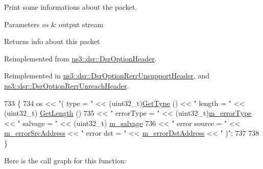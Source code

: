 Print some informations about the packet. 


\begin{DoxyParams}{Parameters}
{\em os} & output stream \\
\hline
\end{DoxyParams}
\begin{DoxyReturn}{Returns}
info about this packet 
\end{DoxyReturn}


Reimplemented from \hyperlink{classns3_1_1dsr_1_1DsrOptionHeader_ae313f9d29f455b27d4d3c71e1cdb28c4}{ns3\+::dsr\+::\+Dsr\+Option\+Header}.



Reimplemented in \hyperlink{classns3_1_1dsr_1_1DsrOptionRerrUnsupportHeader_aa5f1fb1e3f4f2772f6e39955d2941153}{ns3\+::dsr\+::\+Dsr\+Option\+Rerr\+Unsupport\+Header}, and \hyperlink{classns3_1_1dsr_1_1DsrOptionRerrUnreachHeader_a76cc23e1d7c5a76a83c0b877c5652b13}{ns3\+::dsr\+::\+Dsr\+Option\+Rerr\+Unreach\+Header}.


\begin{DoxyCode}
733 \{
734   os << \textcolor{stringliteral}{"( type = "} << (uint32\_t)\hyperlink{classns3_1_1dsr_1_1DsrOptionHeader_a1f45f05b6f07be23f84dfd90fca2519f}{GetType} () << \textcolor{stringliteral}{" length = "} << (uint32\_t)
      \hyperlink{classns3_1_1dsr_1_1DsrOptionHeader_a0db5f2db2771d63e9579de6824a1cd5c}{GetLength} ()
735      << \textcolor{stringliteral}{" errorType = "} << (uint32\_t)\hyperlink{classns3_1_1dsr_1_1DsrOptionRerrHeader_adc5bfd05223715cbd597895e780713ad}{m\_errorType} << \textcolor{stringliteral}{" salvage = "} << (uint32\_t)
      \hyperlink{classns3_1_1dsr_1_1DsrOptionRerrHeader_a7c1d8a0c2f132911439b0f9be6ff4b4d}{m\_salvage}
736      << \textcolor{stringliteral}{" error source = "} << \hyperlink{classns3_1_1dsr_1_1DsrOptionRerrHeader_a48c0d4c518700042672018fa3c76c569}{m\_errorSrcAddress} << \textcolor{stringliteral}{" error dst = "} << 
      \hyperlink{classns3_1_1dsr_1_1DsrOptionRerrHeader_acb476b9a9977b9a10cf19a5934c166c8}{m\_errorDstAddress} << \textcolor{stringliteral}{" )"};
737 
738 \}
\end{DoxyCode}


Here is the call graph for this function\+:


